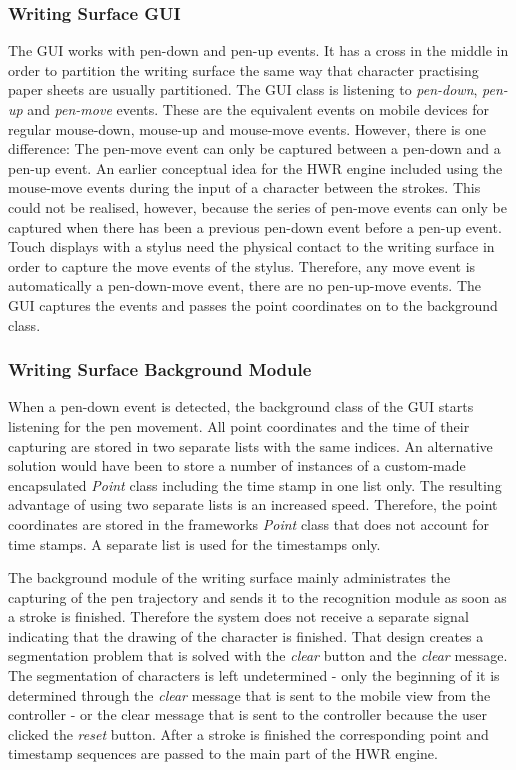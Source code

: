 \subsubsection{Writing Surface GUI}
\label{sec:hwre:writingsurfacegui}
The GUI works with pen-down and pen-up events. It has a cross in the middle in 
order to partition the writing surface the same way that character practising 
paper sheets are usually partitioned. The GUI class is listening to 
\emph{pen-down}, \emph{pen-up} and \emph{pen-move} events.
These are the equivalent events on 
mobile devices for regular mouse-down, mouse-up and mouse-move events. 
However, there is one difference: The pen-move event can only be captured 
between a pen-down and a pen-up event.
An earlier conceptual idea for the HWR engine included using the
mouse-move events during the input of a character between the strokes. 
This could not be realised, however, because the series of pen-move events 
can only be captured when there has been a previous pen-down event before a 
pen-up event. Touch displays with a stylus need the physical contact to the 
writing surface in order to capture the move events of the stylus.
Therefore, any move event is automatically a pen-down-move event,
there are no pen-up-move events.
The GUI captures the events and passes the point coordinates on to 
the background class.

\subsubsection{Writing Surface Background Module}
\label{sec:hwre:writingsurfacebackground}

When a pen-down event is detected, the background class of the GUI starts 
listening for the pen movement. All point coordinates and the time of their 
capturing are stored in two separate lists with the same indices.
An alternative solution would have been to store a number of instances of a 
custom-made encapsulated \emph{Point} class including the time stamp in one 
list only. The resulting advantage of using two separate lists is an 
increased speed.
Therefore, the point coordinates are stored in the frameworks \emph{Point} class
that does not account for time stamps. A separate list is used for the
timestamps only.

The background module of the writing surface mainly administrates the capturing 
of the pen trajectory and sends it to the recognition module as soon as a 
stroke is finished. Therefore the system does not receive a separate signal 
indicating that the drawing of the character is finished. That design creates a
segmentation problem that is solved with the \emph{clear} button and the 
\emph{clear} message. The segmentation of characters is left undetermined - only 
the beginning of it is determined through the \emph{clear} message that is sent 
to the mobile view from the controller - or the clear message that is sent to 
the controller because the user clicked the \emph{reset} button.
After a stroke is finished the corresponding point and timestamp sequences are 
passed to the main part of the HWR engine.

